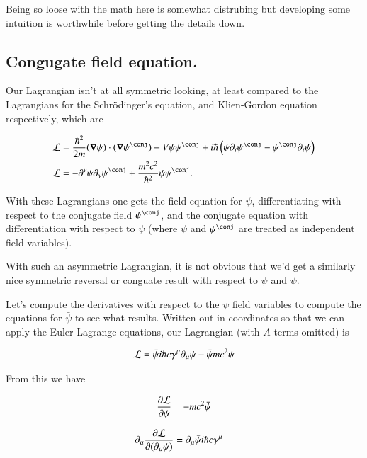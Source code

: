 \documentclass{article}
\begin{document}
Being so loose with the math here is somewhat distrubing but developing some intuition is worthwhile before getting the details down.

\subsection{ Congugate field equation. }

Our Lagrangian isn't at all symmetric looking, at least compared to the Lagrangians for the 
Schr\"{o}dinger's equation, and Klien-Gordon equation respectively, which are

\begin{align}
\LL &= \frac{\hbar^2}{2m}
(\spacegrad \psi) \cdot (\spacegrad \psi^\conj) + V \psi \psi^\conj + {i \hbar} \left( \psi \partial_t \psi^\conj - \psi^\conj \partial_t \psi \right) \\
\LL &= -\partial^\nu \psi \partial_\nu \psi^\conj + \frac{m^2 c^2}{\hbar^2} \psi \psi^\conj.
\end{align}

With these Lagrangians one gets the field equation for $\psi$, differentiating with respect to the conjugate field $\psi^\conj$, and the conjugate equation with differentiation with respect to $\psi$ (where $\psi$ and $\psi^\conj$ are treated as independent field variables).

With such an asymmetric Lagrangian, it is not obvious that we'd get a similarly nice symmetric reversal or conguate result with respect to $\psi$ and $\bar \psi$.

Let's compute the derivatives with respect to the $\psi$ field variables to compute the equations for $\bar \psi$ to see what results.  Written out in coordinates so that we can apply the Euler-Lagrange equations, our Lagrangian (with $A$ terms omitted) is

\begin{align}\label{eqn:lagNoA}
\mathcal{L} = \bar\psi i \hbar c \gamma^\mu \partial_\mu \psi - \bar \psi m c^2 \psi
\end{align}

From this we have

\begin{align*}
\frac{\partial {\mathcal{L}}}{\partial {\psi}} = -m c^2 \bar\psi
\end{align*}

\begin{align*}
\partial_\mu \frac{\partial {\mathcal{L}}}{\partial {(\partial_\mu \psi)}} 
&= \partial_\mu \bar\psi i \hbar c \gamma^\mu
\end{align*}
\end{document}
